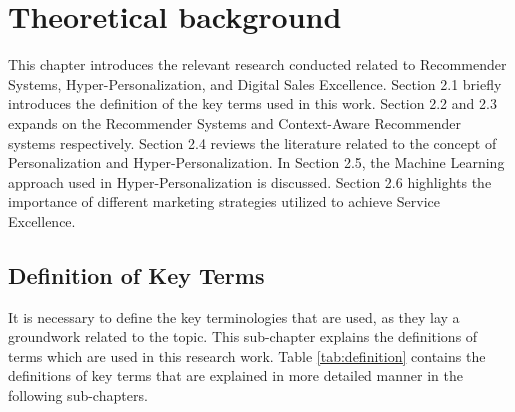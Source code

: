 \chapter{Theoretical background} \label{chap:intro}
This chapter introduces the relevant research conducted related to Recommender Systems, Hyper-Personalization, and Digital Sales Excellence. Section 2.1 briefly introduces the definition of the key terms used in this work. Section 2.2 and 2.3 expands on the Recommender Systems and Context-Aware Recommender systems respectively. Section 2.4 reviews the literature related to the concept of Personalization and Hyper-Personalization. In Section 2.5, the Machine Learning approach used in Hyper-Personalization is discussed. Section 2.6 highlights the importance of different marketing strategies utilized to achieve Service Excellence.

\section{Definition of Key Terms} \label{sect:thefirst}
It is necessary to define the key terminologies that are used, as they lay a groundwork related to the topic. This sub-chapter explains the definitions of terms which are used in this research work.
Table \ref{tab:definition} contains the definitions of key terms that are explained in more detailed manner in the following sub-chapters.


